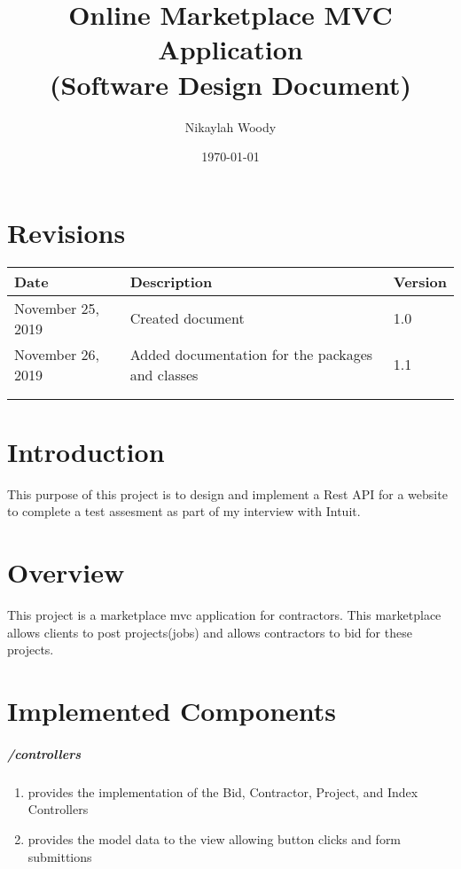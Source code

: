\documentclass[a4paper,12pt]{article}
\begin{document}
\title{%
  Online  Marketplace MVC Application \\
  \large (Software Design Document)}

\author{Nikaylah Woody}
\date{\today}
\maketitle


\newpage
\tableofcontents

\section*{Revisions}
\begin{table}[H]
\begin{tabular}{|l|l|l|}
\hline
Date &Description  &Version \\ \hline
November 25, 2019 &Created document  &1.0  \\ \hline
November 26, 2019 &Added documentation for the packages and classes &1.1  \\ \hline
 &  &  \\ \hline
&  &  \\ \hline
\end{tabular}
\end{table}

\newpage
\section{Introduction}
This purpose of this project is to design and implement a Rest API for a website to complete a test assesment as part of my interview with Intuit.

\section{Overview}
\label{sec}
This project is a marketplace mvc application for contractors. This marketplace allows clients to post projects(jobs) and allows contractors to bid for these projects.



\section{Implemented Components}

\indent
\subparagraph{/controllers}
\begin{enumerate}[label=(\alph*)]
\item provides the implementation of the Bid, Contractor, Project, and Index Controllers
\item provides the model data to the view allowing button clicks and form submittions
\end{enumerate}
\end{document}
